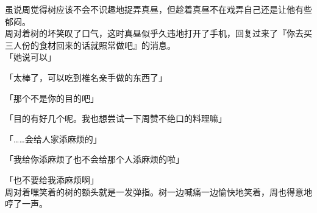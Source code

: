 虽说周觉得树应该不会不识趣地捉弄真昼，但趁着真昼不在戏弄自己还是让他有些郁闷。\\

周对着树的坏笑叹了口气，这时真昼似乎久违地打开了手机，回复过来了『你去买三人份的食材回来的话就照常做吧』的消息。\\

「她说可以」

「太棒了，可以吃到椎名亲手做的东西了」

「那个不是你的目的吧」

「目的有好几个呢。我也想尝试一下周赞不绝口的料理嘛」

「……会给人家添麻烦的」

「我给你添麻烦了也不会给那个人添麻烦的啦」

「也不要给我添麻烦啊」\\

周对着嘿笑着的树的额头就是一发弹指。树一边喊痛一边愉快地笑着，周也得意地哼了一声。
